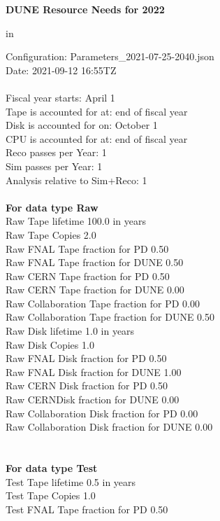 \documentclass[12pt]{article}
\begin{document}
\centerline{\bf{DUNE Resource Needs for 2022}} in \par Configuration: Parameters\_2021-07-25-2040.json\\
  Date: 2021-09-12 16:55TZ\\
   \\
  
 Fiscal year starts: April 1\\ 
Tape is accounted for at: end of fiscal year\\ 
Disk is accounted for on: October 1\\ 
CPU is accounted for at: end of fiscal year\\ 
Reco passes per Year: 1\\
Sim passes per Year: 1\\
Analysis relative to Sim+Reco: 1\\
\pagebreak
\\
{\bf For data type Raw}\\
   Raw Tape lifetime 100.0 in years\\
   Raw Tape Copies   2.0\\
   Raw FNAL Tape fraction for PD  0.50\\
   Raw FNAL Tape fraction for DUNE  0.50\\
   Raw CERN Tape fraction for PD  0.50\\
   Raw CERN Tape fraction for DUNE  0.00\\
   Raw Collaboration Tape fraction for PD  0.00\\
   Raw Collaboration Tape fraction for DUNE  0.50\\
   Raw Disk lifetime   1.0 in years\\
   Raw Disk Copies   1.0\\
   Raw FNAL Disk fraction for PD  0.50\\
   Raw FNAL Disk fraction for DUNE  1.00\\
   Raw CERN Disk fraction for PD  0.50\\
   Raw CERNDisk fraction for DUNE  0.00\\
   Raw Collaboration Disk fraction for PD  0.00\\
   Raw Collaboration Disk fraction for DUNE  0.00\\
\pagebreak\\
\\
{\bf For data type Test}\\
  Test Tape lifetime   0.5 in years\\
  Test Tape Copies   1.0\\
  Test FNAL Tape fraction for PD  0.50\\
\end{document}
